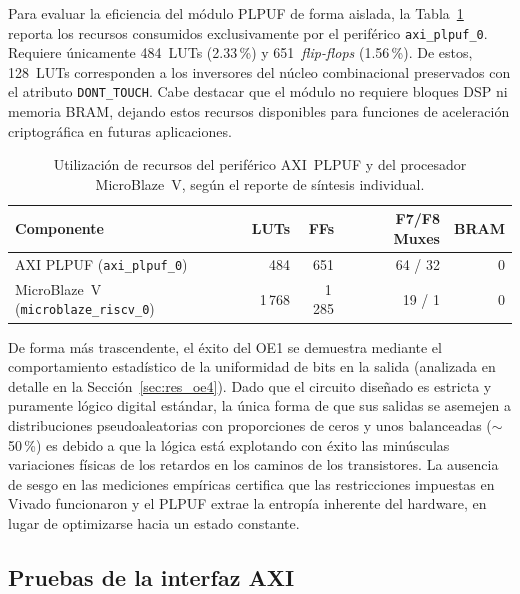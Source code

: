 Para evaluar la eficiencia del módulo PLPUF de forma aislada, la
Tabla~\ref{tab:utilizacion_plpuf} reporta los recursos consumidos
exclusivamente por el periférico \texttt{axi\_plpuf\_0}. Requiere únicamente
484~LUTs (2.33\,\%) y 651~\textit{flip-flops} (1.56\,\%). De estos, 128~LUTs
corresponden a los inversores del núcleo combinacional preservados con el atributo
\texttt{DONT\_TOUCH}. Cabe destacar que el módulo no requiere bloques DSP ni
memoria BRAM, dejando estos recursos disponibles para funciones de aceleración
criptográfica en futuras aplicaciones.

\begin{table}[htbp]
\centering
\caption{Utilización de recursos del periférico AXI~PLPUF y del procesador
  MicroBlaze~V, según el reporte de síntesis individual.}
\label{tab:utilizacion_plpuf}
\small
\renewcommand{\arraystretch}{1.2}
\begin{tabular}{lrrrr}
\hline
\textbf{Componente} & \textbf{LUTs} & \textbf{FFs} & \textbf{F7/F8 Muxes} & \textbf{BRAM} \\
\hline
AXI PLPUF (\texttt{axi\_plpuf\_0})       & 484    & 651    & 64 / 32 & 0  \\
MicroBlaze~V (\texttt{microblaze\_riscv\_0}) & 1\,768 & 1\,285 & 19 / 1  & 0  \\
\hline
\end{tabular}
\end{table}

De forma más trascendente, el éxito del OE1 se demuestra mediante el
comportamiento estadístico de la uniformidad de bits en la salida (analizada
en detalle en la Sección~\ref{sec:res_oe4}). Dado que el circuito diseñado
es estricta y puramente lógico digital estándar, la única forma de que sus
salidas se asemejen a distribuciones pseudoaleatorias con proporciones de ceros y
unos balanceadas ($\sim$50\,\%) es debido a que la lógica está explotando con
éxito las minúsculas variaciones físicas de los retardos en los caminos de
los transistores. La ausencia de sesgo en las mediciones empíricas certifica
que las restricciones impuestas en Vivado funcionaron y el PLPUF extrae la
entropía inherente del hardware, en lugar de optimizarse hacia un estado constante.

\subsection{Pruebas de la interfaz AXI}
\label{sec:res_oe2}

